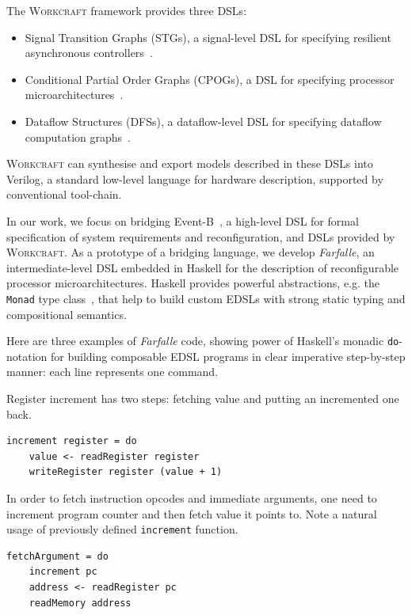 \documentclass[conference]{IEEEtran}
\begin{document}
The \textsc{Workcraft} framework provides three DSLs:

\begin{itemize}
\item Signal Transition Graphs (STGs), a signal-level DSL for
specifying resilient asynchronous controllers~\cite{STG}.
\item Conditional Partial Order Graphs (CPOGs), a DSL for specifying
processor microarchitectures~\cite{ISA-formal}.
\item Dataflow Structures (DFSs), a dataflow-level DSL
for specifying dataflow computation graphs~\cite{DFS}.
\end{itemize}

\textsc{Workcraft} can synthesise and export models described in these DSLs into
Verilog, a standard low-level language for hardware description, supported
by conventional tool-chain.

In our work, we focus on bridging Event-B~\cite{EventB}, a high-level DSL
for formal specification of system requirements and reconfiguration,
and DSLs provided by \textsc{Workcraft}. As a prototype of a bridging language,
we develop \emph{Farfalle}, an intermediate-level DSL embedded in Haskell for
the description of reconfigurable processor microarchitectures.
Haskell provides powerful abstractions, e.g. the \texttt{Monad} type
class~\cite{WadlerMonads},
that help to build custom EDSLs with strong static typing and compositional
semantics.

Here are three examples of \emph{Farfalle} code, showing power of Haskell's
monadic \texttt{do}-notation for building composable EDSL programs in clear
imperative step-by-step manner: each line represents one command.

Register increment has two steps: fetching value and putting an
incremented one back.

\begin{verbatim}
increment register = do
    value <- readRegister register
    writeRegister register (value + 1)
\end{verbatim}

In order to fetch instruction opcodes and immediate arguments, one need to
increment program counter and then fetch value it points to. Note a natural
usage of previously defined \texttt{increment} function.

\begin{verbatim}
fetchArgument = do
    increment pc
    address <- readRegister pc
    readMemory address
\end{verbatim}
\end{document}
